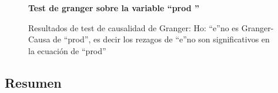 \begin{figure}[H]
		\centering
		\textbf{Test de granger sobre la variable \textquotedblleft prod \textquotedblright}\par\medskip
		\caption{Resultados de test de causalidad de Granger: Ho: \textquotedblleft e\textquotedblright no es Granger-Causa de \textquotedblleft prod\textquotedblright, es decir los rezagos de \textquotedblleft e\textquotedblright no son significativos en la ecuación de \textquotedblleft prod\textquotedblright}\label{figd53}
\end{figure}


%
\subsection{Resumen}

